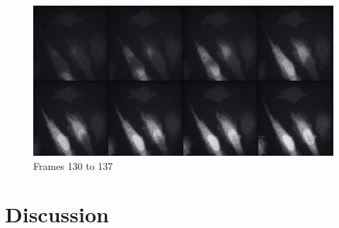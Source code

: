 \documentclass[a4paper,english,12pt,bibliography=totoc]{scrreprt}
\begin{document}
    \begin{figure}[H]
    \centering
    \includegraphics[width=0.9\linewidth]{Images/Calcium/Diffusion Frames.jpg}
    \caption{Frames 130 to 137 }
    \label{fig:enter-label}
\end{figure}

\section{Discussion}
\end{document}
